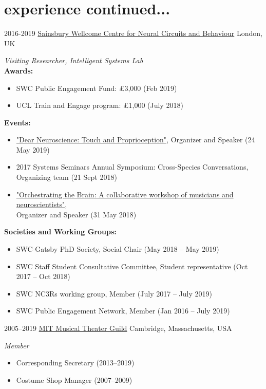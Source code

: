 \documentclass[]{friggeri-cv}
\begin{document}
\newpage
\section{experience continued...}
\begin{entrylist}
\entry
    {2016-2019}
    {\href{https://www.ucl.ac.uk/swc/}{Sainsbury Wellcome Centre for Neural Circuits and Behaviour}}
    {London, UK}
    {\emph{Visiting Researcher, Intelligent Systems Lab} \\
	\textbf{Awards:}
	\begin{itemize}
		\item SWC Public Engagement Fund: £3,000 (Feb 2019)
		\item UCL Train and Engage program: £1,000 (July 2018)
	\end{itemize}
	\textbf{Events:}
	\begin{itemize}
		\item \href{http://www.everymind.online/DearNeuroscience/TouchProprioception/}{"Dear Neuroscience: Touch and Proprioception"}, Organizer and Speaker (24 May 2019)
		\item 2017 Systems Seminars Annual Symposium: Cross-Species Conversations, Organizing team (21 Sept 2018)
		\item \href{https://www.sainsburywellcome.org/web/public-engagement/orchestrating-brain}{"Orchestrating the Brain: A collaborative workshop of musicians and neuroscientists"}, \\Organizer and Speaker (31 May 2018)
	\end{itemize}
	\textbf{Societies and Working Groups:}
	\begin{itemize}
		\item SWC-Gatsby PhD Society, Social Chair (May 2018 -- May 2019)
		\item SWC Staff Student Consultative Committee, Student representative (Oct 2017 -- Oct 2018)
		\item SWC NC3Rs working group, Member (July 2017 -- July 2019)
		\item SWC Public Engagement Network, Member (Jan 2016 -- July 2019)
	\end{itemize}
	}
  \entry
	{2005--2019}
	{\href{http://web.mit.edu/mtg/www/}{MIT Musical Theater Guild}}
	{Cambridge, Massachusetts, USA}
	{\emph{Member}
	\begin{itemize}
		\item Corresponding Secretary (2013--2019)
		\item Costume Shop Manager (2007--2009)

\end{itemize}}
\end{entrylist}
\end{document}
